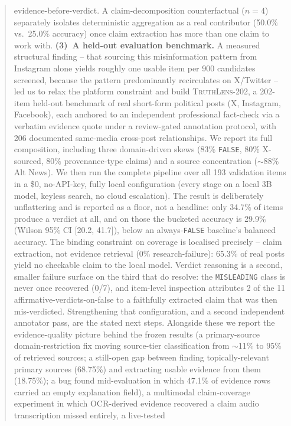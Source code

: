 \documentclass[conference]{IEEEtran}
\begin{document}
\begin{abstract}
evidence-before-verdict. A claim-decomposition counterfactual ($n=4$)
separately isolates deterministic aggregation as a real contributor
(50.0\% vs.\ 25.0\% accuracy) once claim extraction has more than one
claim to work with. \textbf{(3)~A held-out evaluation benchmark.} A
measured structural finding -- that sourcing this misinformation pattern
from Instagram alone yields roughly one usable item per 900 candidates
screened, because the pattern predominantly recirculates on
X/Twitter -- led us to relax the platform constraint and build
\textsc{TruthLens-202}, a 202-item held-out benchmark of real short-form
political posts (X, Instagram, Facebook), each anchored to an independent
professional fact-check via a verbatim evidence quote under a review-gated
annotation protocol, with 206 documented same-media cross-post
relationships. We report its full composition, including three
domain-driven skews (83\% \texttt{FALSE}, 80\% X-sourced, 80\%
provenance-type claims) and a source concentration ($\sim$88\% Alt News).
We then run the complete pipeline over all 193 validation items in a
\$0, no-API-key, fully local configuration (every stage on a local 3B
model, keyless search, no cloud escalation). The result is deliberately
unflattering and is reported as a floor, not a headline: only 34.7\% of
items produce a verdict at all, and on those the bucketed accuracy is
29.9\% (Wilson 95\% CI [20.2, 41.7]), below an always-\texttt{FALSE}
baseline's balanced accuracy. The binding constraint on coverage is
localised precisely -- claim extraction, not evidence retrieval (0\%
research-failure): 65.3\% of real posts yield no checkable claim to the
local model. Verdict reasoning is a second, smaller failure surface on
the third that do resolve: the \texttt{MISLEADING} class is never once
recovered (0/7), and item-level inspection attributes 2 of the 11
affirmative-verdicts-on-false to a faithfully extracted claim that was
then mis-verdicted. Strengthening that configuration, and a
second independent annotator pass, are the stated next steps.
Alongside these we report the evidence-quality picture behind the frozen
results (a primary-source domain-restriction fix moving source-tier
classification from $\sim$11\% to 95\% of retrieved sources; a still-open
gap between finding topically-relevant primary sources (68.75\%) and
extracting usable evidence from them (18.75\%); a bug found mid-evaluation
in which 47.1\% of evidence rows carried an empty explanation field), a
multimodal claim-coverage experiment in which OCR-derived evidence
recovered a claim audio transcription missed entirely, a live-tested

\end{abstract}
\end{document}
